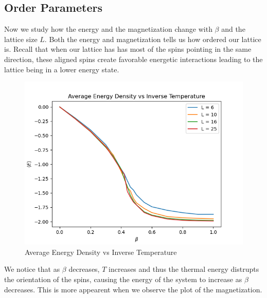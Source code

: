 \documentclass{article}
\begin{document}
\subsection{Order Parameters}

Now we study how the energy and the magnetization change with $\beta$ and the lattice size $L$. 
Both the energy and magnetization tells us how ordered our lattice is. Recall that when our lattice has
has most of the spins pointing in the same direction, these aligned spins create favorable energetic interactions
leading to the lattice being in a lower energy state.

\begin{figure}[ht]
    \includegraphics[width=\columnwidth]{plots/avg_energy_vs_beta.png}
    \caption{Average Energy Density vs Inverse Temperature}
    \label{fig:3}
\end{figure}

We notice that as $\beta$ decreases, $T$ increases and thus the thermal energy distrupts the orientation of the spins, causing
the energy of the system to increase as $\beta$ decreases. This is more appearent when we observe the plot of the magnetization.
\end{document}
